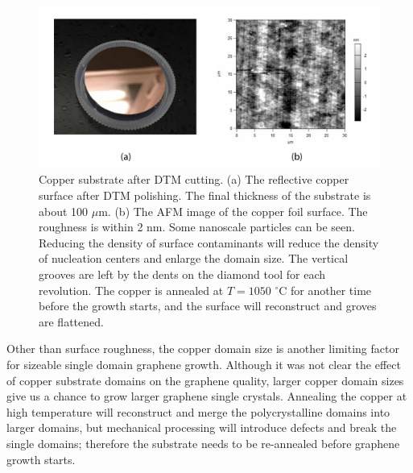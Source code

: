 \documentclass[pdflatex, sectionletters, 12pt, final, phd]{pittetd}    %
\begin{document}
\begin{figure}[h!]
	\centering
	\includegraphics[width=1.0\textwidth]{Drawing/DTMCopper.pdf}
	\caption[Copper substrate after DTM cutting]{Copper substrate after DTM cutting. (a) The reflective copper surface after DTM polishing. The final thickness of the substrate is about 100 $\mu$m. (b) The AFM image of the copper foil surface. The roughness is within 2 nm. Some nanoscale particles can be seen. Reducing the density of surface contaminants will reduce the density of nucleation centers and enlarge the domain size. The vertical grooves are left by the dents on the diamond tool for each revolution. The copper is annealed at $T = 1050$ $^{\circ}$C for another time before the growth starts, and the surface will reconstruct and groves are flattened.}
	\label{FIG:DTMFinishing}
\end{figure}

Other than surface roughness, the copper domain size is another limiting factor for sizeable single domain graphene growth. Although it was not clear the effect of copper substrate domains on the graphene quality\cite{kim2012direct, wang2012controllable, wofford2010graphene}, larger copper domain sizes give us a chance to grow larger graphene single crystals. Annealing the copper at high temperature will reconstruct and merge the polycrystalline domains into larger domains, but mechanical processing will introduce defects and break the single domains; therefore the substrate needs to be re-annealed before graphene growth starts.
\end{document}
